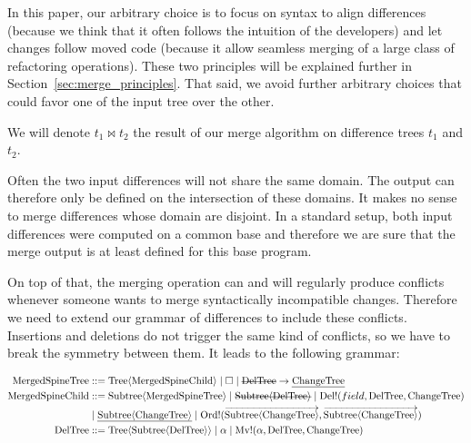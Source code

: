 \documentclass[a4paper,11pt]{article}
\renewcommand\vec[1]{\overrightarrow{#1}}
\newcommand\typsep{\mathrel{|}}
\newcommand\typ[1]{\mathrm{#1}}
\newcommand\typarg[2]{\typ{#1}\langle#2\rangle}
\newenvironment{typgrammar}{
\par\vspace{0.5em}\centering
$\displaystyle\begin{aligned}}{\end{aligned}
$\par\vspace{0.5em}}
\newcommand\merge{\mathbin{\Join}}
\newcommand\del[1]{\text{\st{$#1$}}}
\newcommand\ins[1]{\text{\ul{$#1$}}}
\newcommand\id{\square}
\newcommand\change[2]{\del{#1} \rightarrow \ins{#2}}
\DeclareMathOperator\DelConflict{Del!}
\DeclareMathOperator\OrdConflict{Ord!}
\DeclareMathOperator\MvConflict{Mv!}
\begin{document}
In this paper, our arbitrary choice is to focus on syntax to align differences
(because we think that it often follows the intuition of the developers) and let
changes follow moved code (because it allow seamless merging of a large class of
refactoring operations). These two principles will be explained further in
Section~\ref{sec:merge_principles}. That said, we avoid further arbitrary
choices that could favor one of the input tree over the other.

We will denote $t_1 \merge t_2$ the result of our merge algorithm on difference
trees $t_1$ and $t_2$.

Often the two input differences will not share the same domain. The output can
therefore only be defined on the intersection of these domains. It makes no
sense to merge differences whose domain are disjoint. In a standard setup, both
input differences were computed on a common base and therefore we are sure that
the merge output is at least defined for this base program.

On top of that, the merging operation can and will regularly produce conflicts
whenever someone wants to merge syntactically incompatible changes.
Therefore we need to extend our grammar of differences to include these
conflicts. Insertions and deletions do not trigger the same kind of conflicts,
so we have to break the symmetry between them. It leads to the following
grammar:
\begin{typgrammar}
  \typ{MergedSpineTree} &::= \typarg{Tree}{\typ{MergedSpineChild}} \typsep
    \id \typsep
    \change{\typ{DelTree}}{\typ{ChangeTree}}\\
  \typ{MergedSpineChild} &::= \typarg{Subtree}{\typ{MergedSpineTree}} \typsep
    \del{\typarg{Subtree}{\typ{DelTree}}} \typsep
    \DelConflict(field, \typ{DelTree}, \typ{ChangeTree})\\
    &\typsep \ins{\typarg{Subtree}{\typ{ChangeTree}}} \typsep
    \OrdConflict(\vec{\typarg{Subtree}{\typ{ChangeTree}}},
        \vec{\typarg{Subtree}{\typ{ChangeTree}}})\\
   \typ{DelTree} &::= \typarg{Tree}{\typarg{Subtree}{\typ{DelTree}}} \typsep
    \alpha \typsep
    \MvConflict(\alpha, \typ{DelTree}, \typ{ChangeTree})\\
\end{typgrammar}
\end{document}
